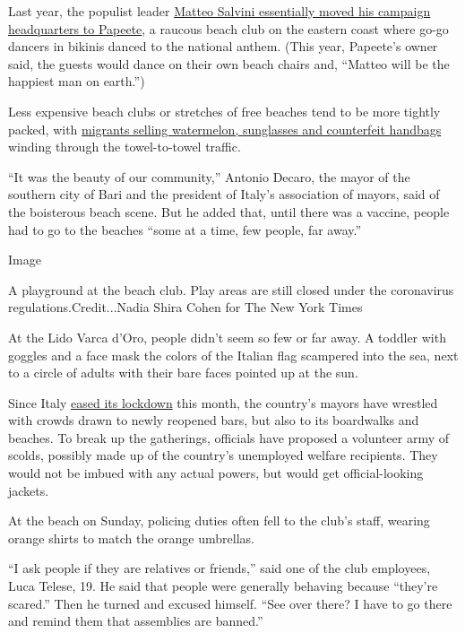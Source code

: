 Last year, the populist leader
\href{https://www.nytimes3xbfgragh.onion/2019/08/08/world/europe/matteo-salvini-italy-beach.html?searchResultPosition=54}{Matteo
Salvini essentially moved his campaign headquarters to Papeete}, a
raucous beach club on the eastern coast where go-go dancers in bikinis
danced to the national anthem. (This year, Papeete's owner said, the
guests would dance on their own beach chairs and, ``Matteo will be the
happiest man on earth.'')

Less expensive beach clubs or stretches of free beaches tend to be more
tightly packed, with
\href{https://www.nytimes3xbfgragh.onion/2019/09/01/world/europe/italy-migrants-beaches.html?searchResultPosition=41}{migrants
selling watermelon, sunglasses and counterfeit handbags} winding through
the towel-to-towel traffic.

``It was the beauty of our community,'' Antonio Decaro, the mayor of the
southern city of Bari and the president of Italy's association of
mayors, said of the boisterous beach scene. But he added that, until
there was a vaccine, people had to go to the beaches ``some at a time,
few people, far away.''

Image

A playground at the beach club. Play areas are still closed under the
coronavirus regulations.Credit...Nadia Shira Cohen for The New York
Times

At the Lido Varca d'Oro, people didn't seem so few or far away. A
toddler with goggles and a face mask the colors of the Italian flag
scampered into the sea, next to a circle of adults with their bare faces
pointed up at the sun.

Since Italy
\href{https://www.nytimes3xbfgragh.onion/interactive/2020/04/05/world/europe/italy-coronavirus-lockdown-reopen.html}{eased
its lockdown} this month, the country's mayors have wrestled with crowds
drawn to newly reopened bars, but also to its boardwalks and beaches. To
break up the gatherings, officials have proposed a volunteer army of
scolds, possibly made up of the country's unemployed welfare recipients.
They would not be imbued with any actual powers, but would get
official-looking jackets.

At the beach on Sunday, policing duties often fell to the club's staff,
wearing orange shirts to match the orange umbrellas.

``I ask people if they are relatives or friends,'' said one of the club
employees, Luca Telese, 19. He said that people were generally behaving
because ``they're scared.'' Then he turned and excused himself. ``See
over there? I have to go there and remind them that assemblies are
banned.''

